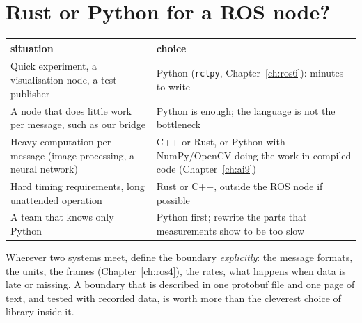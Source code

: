 \section*{Rust or Python for a ROS node?}
\begin{center}
\renewcommand{\arraystretch}{1.25}
\begin{tabular}{p{5.0cm}p{9.0cm}}
\textbf{situation} & \textbf{choice}\\ \hline
Quick experiment, a visualisation node, a test publisher & Python (\verb!rclpy!, Chapter~\ref{ch:ros6}): minutes to write\\
A node that does little work per message, such as our bridge & Python is enough; the language is not the bottleneck\\
Heavy computation per message (image processing, a neural network) & C++ or Rust, or Python with NumPy/OpenCV doing the work in compiled code (Chapter~\ref{ch:ai9})\\
Hard timing requirements, long unattended operation & Rust or C++, outside the ROS node if possible\\
A team that knows only Python & Python first; rewrite the parts that measurements show to be too slow\\
\end{tabular}
\end{center}

\begin{aibox}
Wherever two systems meet, define the boundary \emph{explicitly}: the message formats, the units, the frames (Chapter~\ref{ch:ros4}), the rates, what happens when data is late or missing. A boundary that is described in one protobuf file and one page of text, and tested with recorded data, is worth more than the cleverest choice of library inside it.
\end{aibox}

